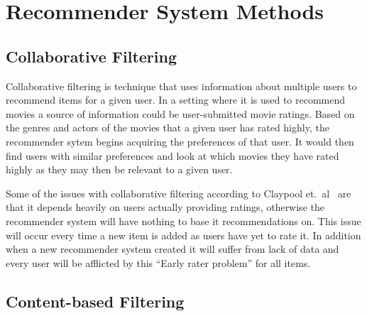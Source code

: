 \section{Recommender System Methods}

\subsection{Collaborative Filtering}
\label{sec:analysis:recommender-methods:collaborative-filtering}

Collaborative filtering is technique that uses information about multiple users to recommend items for a given user.
In a setting where it is used to recommend movies a source of information could be user-submitted movie ratings.
Based on the genres and actors of the movies that a given user has rated highly, the recommender sytem begins acquiring the preferences of that user.
It would  then find users with similar preferences and look at which movies they have rated highly as they may then be relevant to a given user.

Some of the issues with collaborative filtering according to Claypool et.~al~\cite{claypool1999combining} are that it depends heavily on users actually providing ratings, otherwise the recommender system will have nothing to base it recommendations on.
This issue will occur every time a new item is added as users have yet to rate it.
In addition when a new recommender system created it will suffer from lack of data and every user will be afflicted by this ``Early rater problem'' for all items.


\subsection{Content-based Filtering}
\label{sec:analysis:recommender-methods:content-based-filtering}

